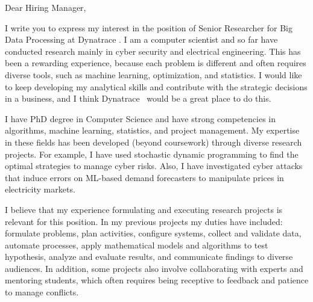 \documentclass[letter,10pt]{letter}
\newcommand{\position}{Senior Researcher for Big Data Processing  }
\newcommand{\place}{Dynatrace }
\begin{document}
\begin{letter}{
}
 
\opening{Dear Hiring Manager,}

I write you to express my interest in the position of \position  at \place.
I am a computer scientist and so far have conducted research mainly in cyber security and electrical engineering. This has been a rewarding experience, because each problem is different and often requires diverse tools, such as machine learning, optimization, and statistics. 
%
%
%
I would like to keep developing my analytical skills and contribute with the strategic decisions in a business, and I think \place \ would be a great place to do this.




I have PhD degree in Computer Science 
and have strong competencies in algorithms, machine learning, statistics, and project management. My expertise in these fields has been developed (beyond coursework) through diverse research projects. 
For example, I have used stochastic dynamic programming to find the optimal strategies to manage cyber risks. 
Also, I have investigated cyber attacks that induce errors on ML-based demand forecasters to manipulate prices in electricity markets. 

I believe that my experience formulating and executing research projects is relevant for this position. In my previous projects my duties have included: formulate problems, plan activities, configure systems, collect and validate data, automate processes, apply mathematical models and algorithms to test hypothesis, analyze and evaluate results,  and communicate findings to diverse audiences. In addition, some projects also involve collaborating with experts and mentoring students, which often requires being receptive to feedback and patience to manage conflicts.



\end{letter}
\end{document}
